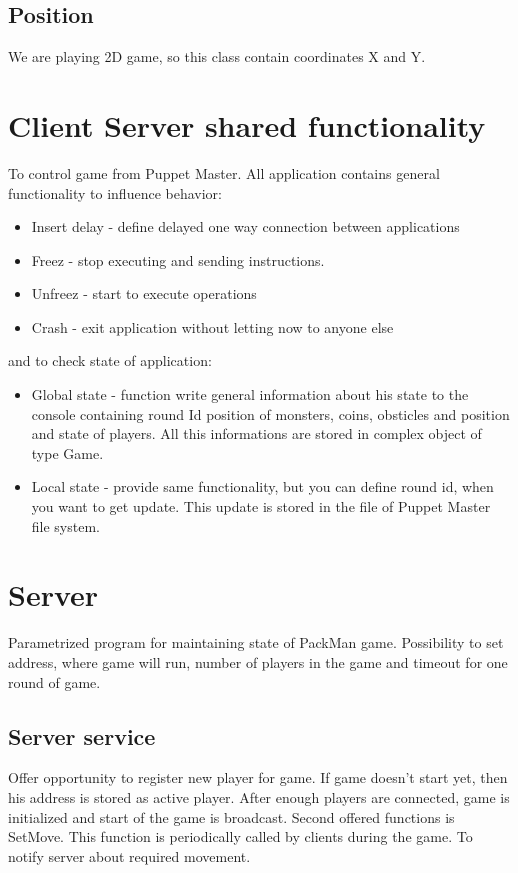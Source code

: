 \documentclass[times, 10pt,twocolumn]{article}
\begin{document}
\subsection{Position}
We are playing 2D game, so this class contain coordinates X and Y.
\section{Client Server shared functionality}
To control game from Puppet Master. All application contains general functionality to influence behavior:
\begin{itemize}
	\item Insert delay - define delayed one way connection between applications
	\item Freez - stop executing and sending instructions.
	\item Unfreez - start to execute operations
	\item Crash - exit application without letting now to anyone else
\end{itemize}
and to check state of application:
\begin{itemize}
	\item Global state - function write general information about his state to the console containing round Id position of monsters, coins, obsticles and position and state of players. All this informations are stored in complex object of type Game.
	\item Local state - provide same functionality, but you can define round id, when you want to get update. This update is stored in the file of Puppet Master file system.
\end{itemize}

\section{Server}
Parametrized program for maintaining state of PackMan game. Possibility to set address, where game will run, number of players in the game and timeout for one round of game.

\subsection{Server service}
Offer opportunity to register new player for game. If game doesn't start yet, then his address is stored as active player. After enough players are connected, game is initialized and start of the game is broadcast. 
Second offered functions is SetMove. This function is periodically called by clients during the game. To notify server about required movement.
\end{document}
